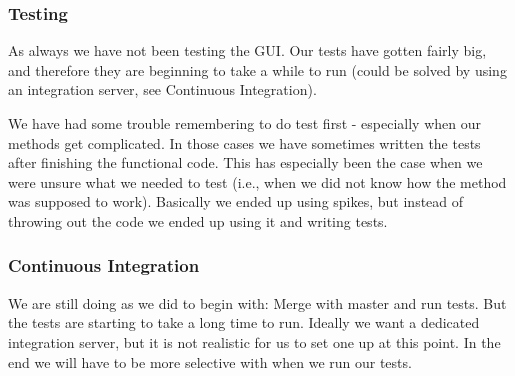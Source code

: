 \subsubsection{Testing}
As always we have not been testing the GUI. Our tests have gotten fairly big, and therefore they are beginning to take a while to run (could be solved by using an integration server, see Continuous Integration).

We have had some trouble remembering to do test first - especially when our methods get complicated. In those cases we have sometimes written the tests after finishing the functional code. This has especially been the case when we were unsure what we needed to test (i.e., when we did not know how the method was supposed to work). Basically we ended up using spikes, but instead of throwing out the code we ended up using it and writing tests. 

\subsubsection{Continuous Integration}
We are still doing as we did to begin with: Merge with master and run tests. But the tests are starting to take a long time to run. Ideally we want a dedicated integration server, but it is not realistic for us to set one up at this point. In the end we will have to be more selective with when we run our tests.